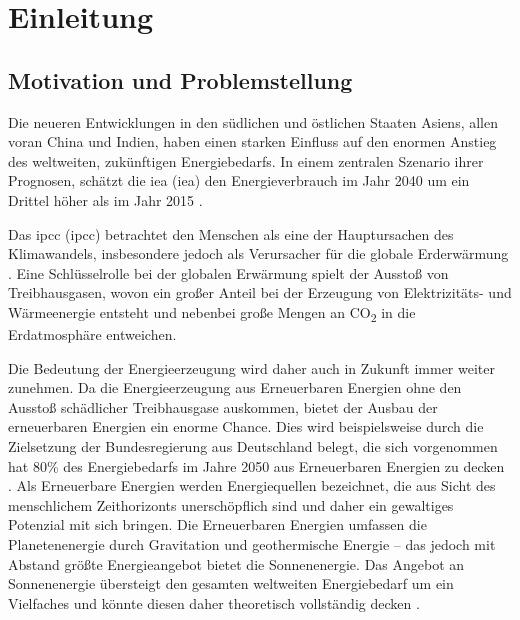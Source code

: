 \renewcommand{\chapterheadstartvskip}{\vspace*{2cm}}

\chapter{Einleitung}
\label{chap:einleitung}
\setcounter{page}{1}
\renewcommand{\chapterheadstartvskip}{\vspace*{-1cm}}


\section{Motivation und Problemstellung}
\label{sec:motivation}

Die neueren Entwicklungen in den südlichen und östlichen Staaten Asiens, allen voran China und Indien, haben einen starken Einfluss auf den enormen Anstieg des weltweiten, zukünftigen Energiebedarfs. In einem zentralen Szenario ihrer Prognosen, schätzt die \acrlong{iea} (\acrshort{iea}) den Energieverbrauch im Jahr 2040 um ein Drittel höher als im Jahr 2015 \cite[S.~1]{in15}.

Das \acrlong{ipcc} (\acrshort{ipcc}) betrachtet den Menschen als eine der Hauptursachen des Klimawandels, insbesondere jedoch als Verursacher für die globale Erderwärmung \cite[S.~V]{ip14}. Eine Schlüsselrolle bei der globalen Erwärmung spielt der Ausstoß von Treibhausgasen, wovon ein großer Anteil bei der Erzeugung von Elektrizitäts- und Wärmeenergie entsteht und nebenbei große Mengen an CO\textsubscript{2} in die Erdatmosphäre entweichen\cite[S.~47]{ip14}.

Die Bedeutung der Energieerzeugung wird daher auch in Zukunft immer weiter zunehmen. Da die Energieerzeugung aus Erneuerbaren Energien ohne den Ausstoß schädlicher Treibhausgase auskommen, bietet der Ausbau der erneuerbaren Energien  ein enorme Chance. Dies wird beispielsweise durch die Zielsetzung der Bundesregierung aus Deutschland belegt, die sich vorgenommen hat 80\% des Energiebedarfs im Jahre 2050 aus Erneuerbaren Energien zu decken \cite[S.~2]{bi15}.
Als Erneuerbare Energien werden Energiequellen bezeichnet, die aus Sicht des menschlichem Zeithorizonts unerschöpflich sind und daher ein gewaltiges Potenzial mit sich bringen. Die Erneuerbaren Energien umfassen die Planetenenergie durch Gravitation und geothermische Energie -- das jedoch mit Abstand größte Energieangebot bietet die Sonnenenergie. Das Angebot an Sonnenenergie übersteigt den gesamten weltweiten Energiebedarf um ein Vielfaches und könnte diesen daher theoretisch vollständig decken \cite[S.~34f.]{qu11}.

